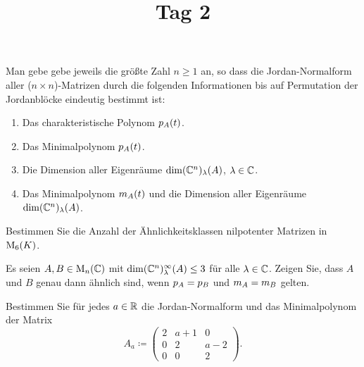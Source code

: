 \documentclass[a4paper, 10pt]{scrartcl}
\title{Tag 2}
\author{}
\date{}
\begin{document}
\begin{question}
  Man gebe gebe jeweils die größte Zahl $n \geq 1$ an, so dass die Jordan-Normalform aller ($n \times n$)-Matrizen durch die folgenden Informationen bis auf Permutation der Jordanblöcke eindeutig bestimmt ist:
  \begin{enumerate}
    \item
      Das charakteristische Polynom $p_{A}(t)$.
    \item
      Das Minimalpolynom $p_{A}(t)$.
    \item
      Die Dimension aller Eigenräume $\dim (\mathbb{C}^n)_{\lambda}(A)$, $\lambda \in \mathbb{C}$.
    \item
      Das Minimalpolynom $m_{A}(t)$ und die Dimension aller Eigenräume $\dim (\mathbb{C}^n)_{\lambda}(A)$.
  \end{enumerate}
\end{question}





\begin{question}
  Bestimmen Sie die Anzahl der Ähnlichkeitsklassen nilpotenter Matrizen in $\operatorname{M}_{6}(K)$.
\end{question}





\begin{question}
  Es seien $A, B \in \operatorname{M}_{n}(\mathbb{C})$ mit $\dim (\mathbb{C}^n)_{\lambda}^{\infty}(A) \leq 3$ für alle $\lambda \in \mathbb{C}$.
  Zeigen Sie, dass $A$ und $B$ genau dann ähnlich sind, wenn $p_{A} = p_{B}$ und $m_{A} = m_{B}$ gelten.
\end{question}





\begin{question}
  Bestimmen Sie für jedes $a \in \mathbb{R}$ die Jordan-Normalform und das Minimalpolynom der Matrix
  \[
              A_a
    \coloneqq \begin{pmatrix}
                2 & a+1 &  0  \\
                0 &  2  & a-2 \\
                0 &  0  &  2
              \end{pmatrix}.
  \]
\end{question}
\end{document}
